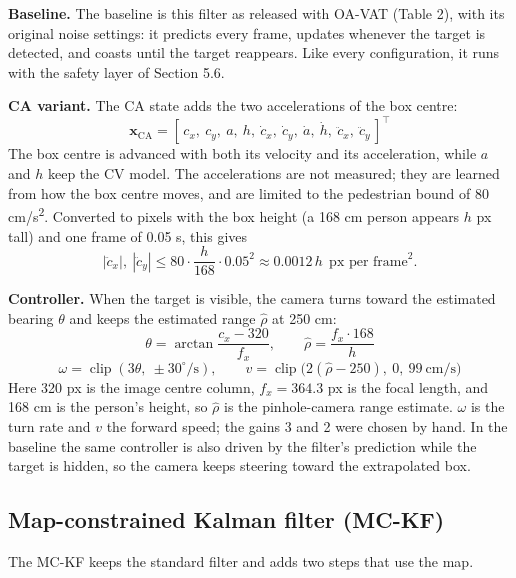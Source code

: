 \documentclass[12pt,a4paper]{article}
\begin{document}
\textbf{Baseline.} The baseline is this filter as released with OA-VAT (Table 2), with its original noise settings: it predicts every frame, updates whenever the target is detected, and coasts until the target reappears. Like every configuration, it runs with the safety layer of Section 5.6.

\textbf{CA variant.} The CA state adds the two accelerations of the box centre:
\begin{equation}
  \mathbf{x}_{\mathrm{CA}} = [\,c_x,\ c_y,\ a,\ h,\ \dot c_x,\ \dot c_y,\ \dot a,\ \dot h,\ \ddot c_x,\ \ddot c_y\,]^{\top}
\end{equation}
The box centre is advanced with both its velocity and its acceleration, while $a$ and $h$ keep the CV model. The accelerations are not measured; they are learned from how the box centre moves, and are limited to the pedestrian bound of 80 cm/s\textsuperscript{2}. Converted to pixels with the box height (a 168 cm person appears $h$ px tall) and one frame of 0.05 s, this gives
\begin{equation}
  |\ddot c_x|,\ |\ddot c_y| \le 80 \cdot \frac{h}{168} \cdot 0.05^2 \approx 0.0012\,h \ \ \text{px per frame}^2.
\end{equation}

\textbf{Controller.} When the target is visible, the camera turns toward the estimated bearing $\theta$ and keeps the estimated range $\hat\rho$ at 250 cm:
\begin{equation}
  \theta = \arctan\frac{c_x-320}{f_x},\qquad \hat{\rho} = \frac{f_x\cdot 168}{h}
\end{equation}
\begin{equation}
  \omega = \operatorname{clip}(3\theta,\ \pm 30^\circ/\mathrm{s}),\qquad v = \operatorname{clip}\big(2(\hat{\rho}-250),\ 0,\ 99\ \mathrm{cm/s}\big)
\end{equation}
Here 320 px is the image centre column, $f_x = 364.3$ px is the focal length, and 168 cm is the person's height, so $\hat\rho$ is the pinhole-camera range estimate. $\omega$ is the turn rate and $v$ the forward speed; the gains 3 and 2 were chosen by hand. In the baseline the same controller is also driven by the filter's prediction while the target is hidden, so the camera keeps steering toward the extrapolated box.

\subsection{Map-constrained Kalman filter (MC-KF)}
The MC-KF keeps the standard filter and adds two steps that use the map.
\end{document}
